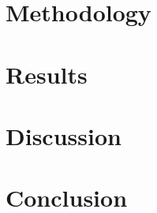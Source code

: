 \documentclass[12pt]{article}
\begin{document}
\section{Methodology}


\section{Results}


\section{Discussion}


\section{Conclusion}




\end{document}
